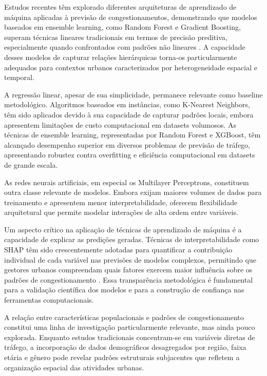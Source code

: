 \documentclass[conference]{IEEEtran}
\begin{document}
Estudos recentes têm explorado diferentes arquiteturas de aprendizado de máquina aplicadas à previsão de congestionamentos, demonstrando que modelos baseados em ensemble learning, como Random Forest e Gradient Boosting, superam técnicas lineares tradicionais em termos de precisão preditiva, especialmente quando confrontados com padrões não lineares \cite{6}. A capacidade desses modelos de capturar relações hierárquicas torna-os particularmente adequados para contextos urbanos caracterizados por heterogeneidade espacial e temporal.

A regressão linear, apesar de sua simplicidade, permanece relevante como baseline metodológico. Algoritmos baseados em instâncias, como K-Nearest Neighbors, têm sido aplicados devido à sua capacidade de capturar padrões locais, embora apresentem limitações de custo computacional em datasets volumosos. As técnicas de ensemble learning, representadas por Random Forest e XGBoost, têm alcançado desempenho superior em diversos problemas de previsão de tráfego, apresentando robustez contra overfitting e eficiência computacional em datasets de grande escala.

As redes neurais artificiais, em especial os Multilayer Perceptrons, constituem outra classe relevante de modelos. Embora exijam maiores volumes de dados para treinamento e apresentem menor interpretabilidade, oferecem flexibilidade arquitetural que permite modelar interações de alta ordem entre variáveis.

Um aspecto crítico na aplicação de técnicas de aprendizado de máquina é a capacidade de explicar as predições geradas. Técnicas de interpretabilidade como SHAP têm sido crescentemente adotadas para quantificar a contribuição individual de cada variável nas previsões de modelos complexos, permitindo que gestores urbanos compreendam quais fatores exercem maior influência sobre os padrões de congestionamento \cite{7}. Essa transparência metodológica é fundamental para a validação científica dos modelos e para a construção de confiança nas ferramentas computacionais.

A relação entre características populacionais e padrões de congestionamento constitui uma linha de investigação particularmente relevante, mas ainda pouco explorada. Enquanto estudos tradicionais concentram-se em variáveis diretas de tráfego, a incorporação de dados demográficos desagregados por região, faixa etária e gênero pode revelar padrões estruturais subjacentes que refletem a organização espacial das atividades urbanas.
\end{document}
